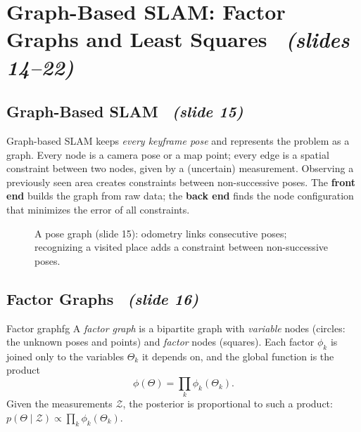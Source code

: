 \documentclass[11pt,a4paper]{article}
\newcommand{\slr}[1]{\texorpdfstring{\ \emph{(slides #1)}}{ (slides #1)}}
\newcommand{\slrs}[1]{\texorpdfstring{\ \emph{(slide #1)}}{ (slide #1)}}
\newcommand{\bx}{\mathbf{x}}
\begin{document}
\section{Graph-Based SLAM: Factor Graphs and Least Squares \slr{14--22}}
\subsection{Graph-Based SLAM \slrs{15}}
Graph-based SLAM keeps \emph{every keyframe pose} and represents the problem as a graph. Every node is a camera pose or a map point; every edge is a spatial constraint between two nodes, given by a (uncertain) measurement. Observing a previously seen area creates constraints between non-successive poses. The \textbf{front end} builds the graph from raw data; the \textbf{back end} finds the node configuration that minimizes the error of all constraints.

\begin{figure}[htbp]\centering
{}
\caption{A pose graph (slide 15): odometry links consecutive poses; recognizing a visited place adds a constraint between non-successive poses.}
\end{figure}

\subsection{Factor Graphs \slrs{16}}
\begin{definition}{Factor graph}{fg}
A \emph{factor graph} is a bipartite graph with \emph{variable} nodes (circles: the unknown poses and points) and \emph{factor} nodes (squares). Each factor $\phi_k$ is joined only to the variables $\Theta_k$ it depends on, and the global function is the product
\[
\phi(\Theta)=\prod_k\phi_k(\Theta_k).
\]
Given the measurements $\mathcal Z$, the posterior is proportional to such a product: $p(\Theta\mid\mathcal Z)\propto\prod_k\phi_k(\Theta_k)$.
\end{definition}
\end{document}
